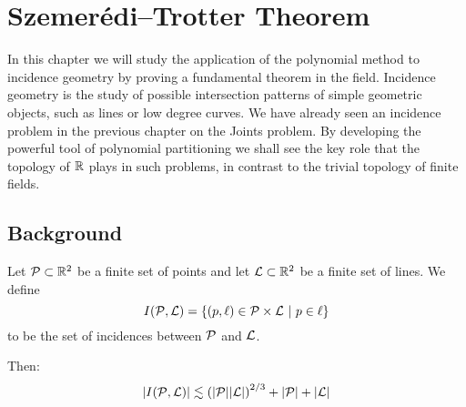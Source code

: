 \chapter{Szemerédi–Trotter Theorem}

In this chapter we will study the application of the polynomial method to incidence geometry by proving a fundamental theorem in the field.
Incidence geometry is the study of possible intersection patterns of simple geometric objects, such as lines or low degree curves. 
We have already seen an incidence problem in the previous chapter on the Joints problem. 
By developing the powerful tool of polynomial partitioning we shall see the key role that the topology of $\mathbb R$ plays in such problems, in contrast to the trivial topology of finite fields. 


\section{Background}



\begin{theorem}
    Let $\mathcal P \subset\mathbb R^2$ be a finite set of points and
    let $\mathcal L \subset \mathbb R^2$ be a finite set of lines. We define 
    \[I(\PP,\LL) = \{(p, \ell) \in \PP \times \LL \ | \ p \in \ell\}\] 
    to be the set of incidences between $\mathcal P$ and $\mathcal L$. 
   
    Then:
    \[
        |I(\mathcal P, \mathcal L)| \lesssim \left(|\mathcal P||\mathcal L|\right)^{2/3} + |\mathcal P| + |\mathcal L|
    \]
    
    \label{thm:S-T}
\end{theorem}

